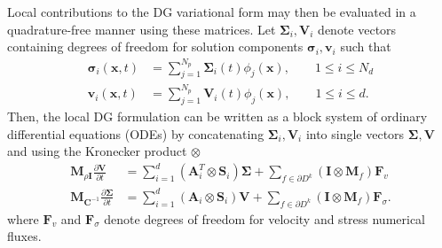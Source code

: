 \documentclass{siamart0216}
\newcommand{\pd}[2]{\frac{\partial#1}{\partial#2}}
\newcommand{\LRp}[1]{\left( #1 \right)}
\begin{document}
Local contributions to the DG variational form may then be evaluated in a quadrature-free manner using these matrices.  Let $\bm{\Sigma}_i,\bm{V}_i$ denote vectors containing degrees of freedom for solution components $\bm{\sigma}_i, \bm{v}_i$ such that 
\begin{align*}
\bm{\sigma}_{i}(\bm{x},t) &= \sum_{j=1}^{N_p} \bm{\Sigma}_i(t) \phi_j(\bm{x}), \qquad 1 \leq i \leq N_d\\ 
\bm{v}_{i}(\bm{x},t) &= \sum_{j=1}^{N_p} \bm{V}_i(t) \phi_j(\bm{x}), \qquad 1 \leq i \leq d. 
\end{align*}
Then, the local DG formulation can be written as a block system of ordinary differential equations (ODEs)
by concatenating $\bm{\Sigma}_i,\bm{V}_i$ into single vectors $\bm{\Sigma},\bm{V}$ and using the Kronecker product $\otimes$
\begin{align}
\bm{M}_{\rho \bm{I}} \pd{\bm{V}}{t} &= \sum_{i=1}^d  \LRp{\bm{A}_i^T\otimes \bm{S}_{i}} \bm{\Sigma} + \sum_{f\in \partial D^k}\LRp{\bm{I}\otimes \bm{M}_f}\bm{F}_{v}\nonumber\\
\bm{M}_{\bm{C}^{-1}} \pd{\bm{\Sigma}}{t} &= \sum_{i=1}^d \LRp{\bm{A}_i\otimes \bm{S}_{i}}\bm{V}  +  \sum_{f\in \partial D^k}\LRp{\bm{I}\otimes\bm{M}_f}\bm{F}_{\sigma}. 
\label{eq:dgmat}
\end{align}
where $\bm{F}_{v}$ and $\bm{F}_{\sigma}$ denote degrees of freedom for velocity and stress numerical fluxes.  
\end{document}
